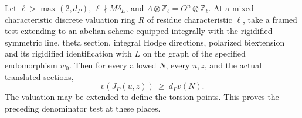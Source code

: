 \begin{proposition}
\label{newtheta:goodjet}
Let \(\ell>\max(2,d_P)\), \(\ell\nmid M\delta_E\), and
\(\Lambda\otimes\mathbb Z_\ell=O^n\otimes\mathbb Z_\ell\).
At a mixed-characteristic discrete valuation ring \(R\) of residue
characteristic \(\ell\), take a framed test extending to an abelian
scheme equipped integrally with the rigidified symmetric line,
theta section, integral Hodge directions, polarized biextension
and its rigidified identification with \(L\) on the graph of the
specified endomorphism \(w_0\). Then for every allowed \(N\),
every \(u,z\), and the actual translated sections,
\[
                 v(J_P(u,z))\ \ge\ d_P v(N).
\]
The valuation may be extended to define the torsion points.
This proves the preceding denominator test at these places.
\end{proposition}
